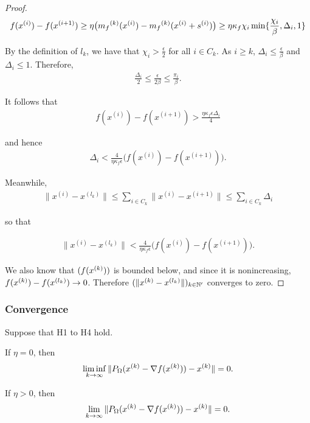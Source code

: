 \begin{proof}
\begin{align}
f(x^{(i)}) - f(x^{(i+1)}) \ge \eta\big ( {{m}_f}^{(k)}(x^{(i)}) - {{m}_f}^{(k)}(x^{(i)} + s^{(i)}) \big ) \ge \eta \kappa_f \chi_i \min\{\frac{\chi_{i}}{\beta}, \Delta_i, 1\} 
\end{align}

By the definition of $l_k$, we have that $\chi_i > \frac{\epsilon}{2}$ for all $i \in C_k$.
As $i \ge k$, $\Delta_i \le \frac{\epsilon}{\beta}$ and $\Delta_i \le 1$.
Therefore,
\begin{align}
\frac{\Delta_i}{2} \le \frac{\epsilon}{2\beta} \le \frac{\pi_i}{\beta}.
\end{align}

It follows that
\begin{align}
f(x^{(i)}) - f(x^{(i+1)}) > \frac{\eta \kappa_f \epsilon \Delta_i}{4}
\end{align}

and hence
\begin{align}
\Delta_i < \frac{4}{\eta \kappa_f \epsilon} \big ( f(x^{(i)}) - f(x^{(i+1)})\big ).
\end{align}

Meanwhile,
\begin{align}
\|x^{(i)} - x^{(l_k)}\| \le \sum_{i \in C_k}\|x^{(i)} - x^{(i+1)}\| \le \sum_{i \in C_k} \Delta_i
\end{align}

so that

\begin{align}
\|x^{(i)} - x^{(l_k)}\| < \frac{4}{\eta \kappa_f \epsilon} \big ( f(x^{(i)}) - f(x^{(i+1)})\big ).
\end{align}

We also know that $(f({x}^{(k)}))$ is bounded below, and since it is nonincreasing, $f({x}^{(k)})  - f(x^{(l_k)}) \to 0$.
Therefore $(\|{x}^{(k)} - x^{(l_k)}\|)_{k \in \mathbb N '}$ converges to zero.

\end{proof}

\subsubsection{Convergence}

\begin{theorem}
Suppose that H1 to H4 hold.

If $\eta = 0$, then
\begin{align}
\liminf_{k\to\infty} \|P_{\Omega}({x}^{(k)} - \nabla f({x}^{(k)})) - {x}^{(k)} \| = 0.
\end{align}

If $\eta > 0$, then
\begin{align}
\lim_{k\to\infty} \|P_{\Omega}({x}^{(k)} - \nabla f({x}^{(k)})) - {x}^{(k)} \| = 0.
\end{align}

\end{theorem}

